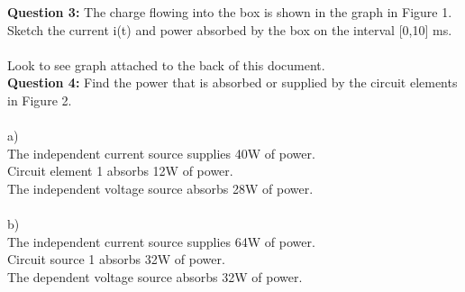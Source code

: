\documentclass{article}
\begin{document}
\textbf{Question 3:} The charge flowing into the box is shown in the graph in Figure 1. Sketch the current i(t) and power absorbed by the box on the interval [0,10] ms.\\
\\
Look to see graph attached to the back of this document.\\


\textbf{Question 4:} Find the power that is absorbed or supplied by the circuit elements in Figure 2.\\
\\
\tab a) \\
The independent current source supplies 40W of power.\\
Circuit element 1 absorbs 12W of power.\\
The independent voltage source absorbs 28W of power.\\
\\
\tab b) \\
The independent current source supplies 64W of power.\\
Circuit source 1 absorbs 32W of power.\\
The dependent voltage source absorbs 32W of power.\\
\end{document}
